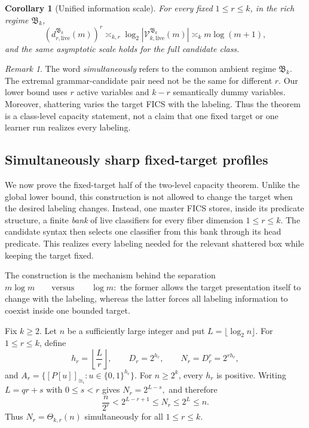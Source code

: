 \documentclass[11pt]{article}
\newtheorem{corollary}[theorem]{Corollary}
\theoremstyle{definition}
\theoremstyle{remark}
\newtheorem{remark}[theorem]{Remark}
\begin{document}
\begin{corollary}[Unified information scale]
For every fixed \(1\le r\le k\), in the rich regime \(\mathfrak B_k\),
\[
\boxed{
(d_{r,\mathrm{live}}^{\mathfrak B_k}(m))^r
\asymp_{k,r}
\log_2|\mathcal V_{k,\mathrm{live}}^{\mathfrak B_k}(m)|
\asymp_k
m\log(m+1),
}
\]
and the same asymptotic scale holds for the full candidate class.
\end{corollary}

\begin{remark}
The word \emph{simultaneously} refers to the common ambient regime
\(\mathfrak B_k\). The extremal grammar-candidate pair need not be the same for
different \(r\). Our lower bound uses \(r\) active variables and \(k-r\)
semantically dummy variables.  Moreover, shattering varies the target FICS with
the labeling.  Thus the theorem is a class-level capacity statement, not a
claim that one fixed target or one learner run realizes every labeling.
\end{remark}


\subsection{Simultaneously sharp fixed-target profiles}
\label{subsec:simultaneous-fixed-target}

We now prove the fixed-target half of the two-level capacity theorem.
Unlike the global lower bound, this construction is not allowed to change the
target when the desired labeling changes.  Instead, one master FICS stores,
inside its predicate structure, a finite \emph{bank} of live classifiers for
every fiber dimension \(1\le r\le k\).  The candidate syntax then selects one
classifier from this bank through its head predicate.  This realizes every
labeling needed for the relevant shattered box while keeping the target fixed.

The construction is the mechanism behind the separation
\(m\log m \qquad\text{versus}\qquad \log m:\)
the former allows the target presentation itself to change with the labeling,
whereas the latter forces all labeling information to coexist inside one
bounded target.

Fix \(k\ge2\).  Let \(n\) be a sufficiently large integer and put
\(L=\lfloor\log_2 n\rfloor.\)
For \(1\le r\le k\), define
\[
h_r=\left\lfloor\frac{L}{r}\right\rfloor,
\qquad
D_r=2^{h_r},
\qquad
N_r=D_r^r=2^{r h_r},
\]
and
\(A_r = \{[P[u]]_{\cong_\iota}:u\in\{0,1\}^{h_r}\}.\)
For \(n\ge2^k\), every \(h_r\) is positive.  Writing
\(L=qr+s\) with \(0\le s<r\) gives
\(N_r=2^{L-s},\)
and therefore
\begin{equation}
\label{eq:Nr-scale}
\frac{n}{2^r}
<
2^{L-r+1}
\le
N_r
\le
2^L
\le
n.
\end{equation}
Thus \(N_r=\Theta_{k,r}(n)\) simultaneously for all \(1\le r\le k\).
\end{document}
